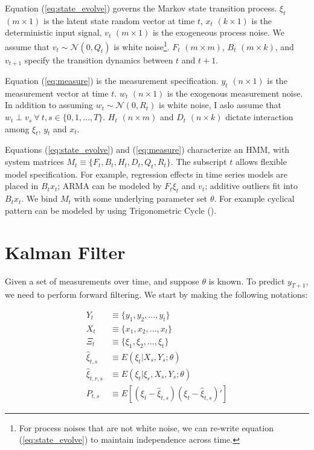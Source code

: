 \documentclass[12pt]{article}
\numberwithin{equation}{section}
\begin{document}
Equation (\ref{eq:state_evolve}) governs the Markov state transition process. $\xi_t$ $(m\times 1)$ is the latent state random vector at time $t$, $x_t$ $(k\times 1)$ is the deterministic input signal, $v_t$ $(m\times 1)$ is the exogeneous process noise. We assume that $v_t\sim \mathcal{N}(0,Q_t)$ is white noise\footnote{For process noises that are not white noise, we can re-write equation (\ref{eq:state_evolve}) to maintain independence across time.}. $F_t$ $(m\times m)$, $B_t$ $(m\times k)$, and $v_{t+1}$ specify the transition dynamics between $t$ and $t+1$. 

Equation (\ref{eq:measure}) is the measurement specification. $y_t$ $(n\times 1)$ is the measurement vector at time $t$. $w_t$ $(n\times 1)$ is the exogenous measurement noise. In addition to assuming $w_t\sim \mathcal{N}(0, R_t)$ is white noise, I aslo assume that  $w_t \perp v_s \ \forall\  t,s\in\{0,1,...,T\}$. $H_t$ $(n\times m)$ and $D_t$ $(n\times k)$ dictate interaction among $\xi_t$, $y_t$ and $x_t$. 

Equations (\ref{eq:state_evolve}) and (\ref{eq:measure}) characterize an HMM, with system matrices $M_t\equiv\{F_t, B_t, H_t, D_t, Q_t, R_t\}$. The subscript $t$ allows flexible model specification. For example, regression effects in time series models are placed in $B_t x_t$; ARMA can be modeled by $F_t\xi_t$ and $v_t$; additive outliers fit into $B_t x_t$. We bind $M_t$ with some underlying parameter set $\theta$. For example cyclical pattern can be modeled by using Trigonometric Cycle (\cite{harvey_1985}).  

\section{Kalman Filter} \label{sec:filter}

Given a set of measurements over time, and suppose $\theta$ is known. To predict $y_{T+1}$, we need to perform forward filtering. We start by making the following notations:

\begin{align*}
    Y_t &\equiv \{y_1, y_2, ..., y_t\} \\
    X_t &\equiv \{x_1, x_2, ..., x_t\} \\
    \Xi_t &\equiv \{\xi_1,\xi_2,...,\xi_t\} \\
    \hat{\xi}_{t,s} &\equiv E(\xi_t|X_{s},Y_{s};\theta) \\
    \hat{\xi}_{t,r,s} &\equiv E(\xi_t|\xi_r,X_{s},Y_{s};\theta) \\
    P_{t,s} &\equiv E[(\xi_t-\hat{\xi}_{t,s})(\xi_t-\hat{\xi}_{t,s})']
\end{align*}
\end{document}
